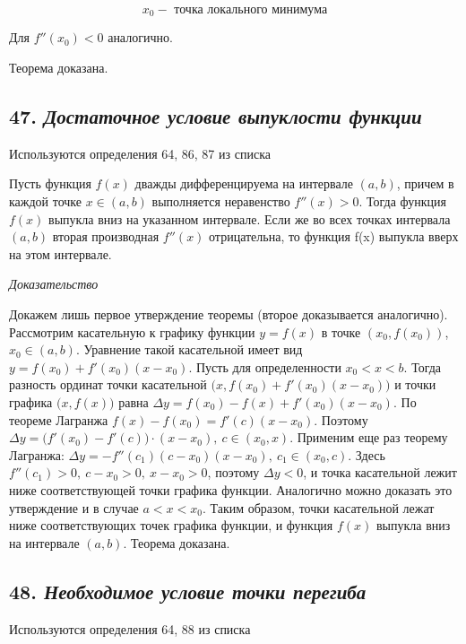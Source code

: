 $$
x_0 - \text{ точка локального минимума}
$$

Для $f''(x_0)<0$ аналогично.

Теорема доказана.
\newpage 
\subsection*{47. \textit{Достаточное условие выпуклости функции}}
\begin{Quote2} 
\small\centering 

Используются определения 64, 86, 87 из списка \end{Quote2} 

Пусть функция $f(x)$ дважды дифференцируема на интервале $(a, b)$, причем в каждой точке $x \in (a, b)$ выполняется неравенство $f''(x) > 0$. Тогда функция $f(x)$ выпукла вниз на указанном интервале. Если же во всех точках интервала $(a, b)$ вторая производная $f''(x)$ отрицательна, то функция f(x) выпукла вверх на этом интервале.
\vspace*{20pt} 

\textit{Доказательство}

Докажем лишь первое утверждение теоремы (второе доказывается аналогично). Рассмотрим касательную к графику функции $y = f(x)$ в точке $(x_0, f(x_0))$, $x_0 \in (a, b)$. Уравнение такой касательной имеет вид $y = f(x_0) + f'(x_0)(x - x_0)$. Пусть для определенности $x_0 < x < b$. Тогда разность ординат точки касательной $\big(x, f(x_0) + f'(x_0)(x - x_0)\big)$ и точки графика $\big(x, f(x)\big)$ равна $\Delta y = f(x_0) - f(x) + f'(x_0)(x - x_0).$ По теореме Лагранжа $f(x) - f(x_0) = f'(c)(x - x_0).$ Поэтому $\Delta y = \big(f'(x_0) - f'(c)\big)\cdot(x - x_0), \ c \in (x_0, x).$ Применим еще раз теорему Лагранжа: $\Delta y = -f''(c_1)(c - x_0)(x - x_0),\ c_1 \in (x_0, c).$ Здесь $f''(c_1) > 0,\ c - x_0 > 0, \ x - x_0 > 0$, поэтому $\Delta y < 0$, и точка касательной лежит ниже соответствующей точки графика функции. Аналогично можно доказать это утверждение и в случае $a < x < x_0$. Таким образом, точки касательной лежат ниже соответствующих точек графика функции, и функция $f(x)$ выпукла вниз на интервале $(a, b)$. Теорема доказана.
\newpage 
\subsection*{48. \textit{Необходимое условие точки перегиба}}
\begin{Quote2} 
\small\centering 

Используются определения 64, 88 из списка \end{Quote2} 

